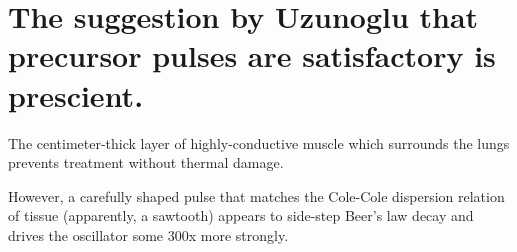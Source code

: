 \documentclass[fleqn,10pt]{paper}
\begin{document}
\section{The suggestion by Uzunoglu that precursor pulses are satisfactory is prescient.} 

The centimeter-thick layer of highly-conductive muscle which surrounds the lungs prevents treatment 
without thermal damage.
 
However, a carefully shaped pulse that matches the Cole-Cole dispersion relation of tissue 
(apparently, a sawtooth) appears to side-step Beer's law decay and drives the oscillator some 300x 
more strongly.
\end{document}
